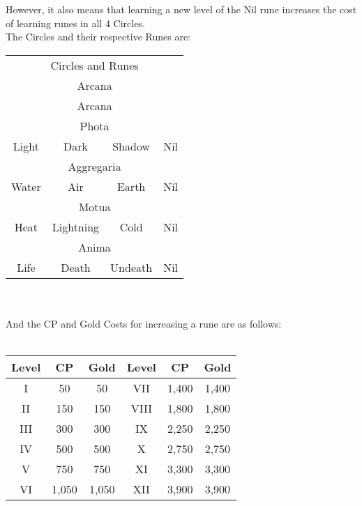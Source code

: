 However, it also means that learning a new level of the Nil rune increases the cost of learning runes in all 4 Circles.\\

The Circles and their respective Runes are:

\begin{tabular}{c | c | c | c}
	\multicolumn{4}{c}{Circles and Runes}\\
	\multicolumn{4}{c}{Arcana} \\
	\multicolumn{4}{c}{Arcana} \\
	\hline
	\hline
	\multicolumn{4}{c}{Phota}\\
	Light & Dark & Shadow & Nil\\
	\hline
	\hline
	\multicolumn{4}{c}{Aggregaria}\\
	Water & Air & Earth & Nil\\
	\hline
	\hline
	\multicolumn{4}{c}{Motua}\\
	Heat & Lightning & Cold & Nil\\
	\hline
	\hline
	\multicolumn{4}{c}{Anima}\\
	Life & Death & Undeath & Nil\\
\end{tabular}
\\
\\
And the CP and Gold Costs for increasing a rune are as follows:
\\
\\
\begin{tabular}{c | c | c || c | c | c}
	Level & CP & Gold & Level & CP & Gold \\ \hline
	I & 50 & 50 & VII & 1,400 & 1,400 \\
	II & 150 & 150 & VIII & 1,800 & 1,800 \\
	III & 300 & 300 & IX & 2,250 & 2,250 \\
	IV & 500 & 500 & X & 2,750 & 2,750 \\
	V & 750 & 750 & XI & 3,300 & 3,300 \\
	VI & 1,050 & 1,050 & XII & 3,900 & 3,900 \\
\end{tabular}
\onecolumn

	
	
	
	
	
	
	
	
